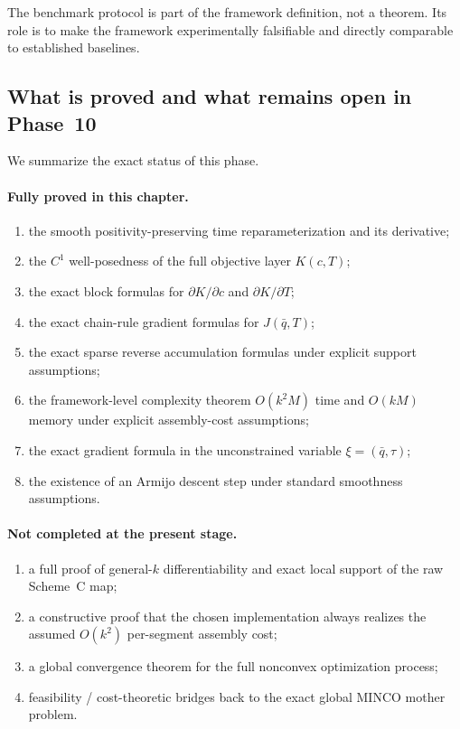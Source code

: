 \begin{remark}
\label{rem:phase10_benchmark_scope}
The benchmark protocol is part of the framework definition, not a theorem.
Its role is to make the framework experimentally falsifiable and directly comparable to established baselines.
\end{remark}

\subsection{What is proved and what remains open in Phase~10}
\label{subsec:phase10_status}

We summarize the exact status of this phase.

\paragraph{Fully proved in this chapter.}
\begin{enumerate}
    \item the smooth positivity-preserving time reparameterization and its derivative;
    \item the \(C^1\) well-posedness of the full objective layer \(K(c,T)\);
    \item the exact block formulas for \(\partial K/\partial c\) and \(\partial K/\partial T\);
    \item the exact chain-rule gradient formulas for \(J(\bar q,T)\);
    \item the exact sparse reverse accumulation formulas under explicit support assumptions;
    \item the framework-level complexity theorem \(O(k^2M)\) time and \(O(kM)\) memory under explicit assembly-cost assumptions;
    \item the exact gradient formula in the unconstrained variable \(\xi=(\bar q,\tau)\);
    \item the existence of an Armijo descent step under standard smoothness assumptions.
\end{enumerate}

\paragraph{Not completed at the present stage.}
\begin{enumerate}
    \item a full proof of general-\(k\) differentiability and exact local support of the raw Scheme~C map;
    \item a constructive proof that the chosen implementation always realizes the assumed \(O(k^2)\) per-segment assembly cost;
    \item a global convergence theorem for the full nonconvex optimization process;
    \item feasibility / cost-theoretic bridges back to the exact global MINCO mother problem.
\end{enumerate}

